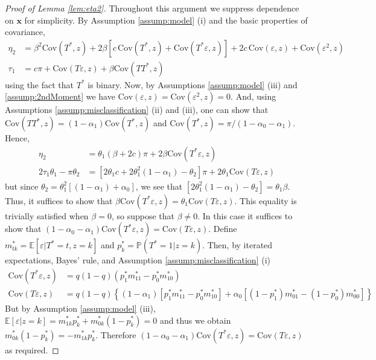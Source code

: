 \documentclass[12pt]{article}
\begin{document}
\begin{proof}[Proof of Lemma \ref{lem:eta2}]
  Throughout this argument we suppress dependence on $\mathbf{x}$ for simplicity. 
  By Assumption \ref{assump:model} (i) and the basic properties of covariance, 
\begin{align*}
    \eta_2 &= \beta^2 \mbox{Cov}(T^*,z) + 2 \beta\left[ c\, \mbox{Cov}(T^*,z) + \mbox{Cov}(T^*\varepsilon,z)  \right] + 2c \, \mbox{Cov}(\varepsilon,z) + \mbox{Cov}(\varepsilon^2,z)\\
  \tau_1 &= c \pi + \mbox{Cov}(T\varepsilon,z) + \beta \mbox{Cov}(TT^*,z)
\end{align*}
using the fact that $T^*$ is binary. 
Now, by Assumptions \ref{assump:model} (iii) and \ref{assump:2ndMoment} we have $\mbox{Cov}(\varepsilon,z) = \mbox{Cov}(\varepsilon^2,z) = 0$.
And, using Assumptions \ref{assump:misclassification} (ii) and (iii), one can show that $\mbox{Cov}(TT^*,z) = (1 - \alpha_1)\mbox{Cov}(T^*,z)$ and $\mbox{Cov}(T^*,z) = \pi/(1 - \alpha_0 - \alpha_1)$.
Hence, 
\begin{align*}
  \eta_2 &= \theta_1\left( \beta 
+ 2 c \right) \pi + 2\beta \mbox{Cov}(T^*\varepsilon,z) \\
  2 \tau_1 \theta_1 - \pi \theta_2 &= \left[2\theta_1 c + 2 \theta_1^2 (1 - \alpha_1) - \theta_2\right]\pi + 2\theta_1 \mbox{Cov}(T\varepsilon,z) 
\end{align*}
but since $\theta_2 = \theta_1^2 \left[ (1 - \alpha_1) + \alpha_0 \right]$, we see that $[2\theta_1^2(1 - \alpha_1) - \theta_2] = \theta_1 \beta$.
Thus, it suffices to show that $\beta \mbox{Cov}(T^*\varepsilon,z) = \theta_1 \mbox{Cov}(T\varepsilon,z)$.
This equality is trivially satisfied when $\beta=0$, so suppose that $\beta \neq 0$. 
In this case it suffices to show that $(1 - \alpha_0 - \alpha_1) \mbox{Cov}(T^*\varepsilon,z) = \mbox{Cov}(T\varepsilon,z)$.
Define $m^*_{tk} = \mathbb{E}\left[ \varepsilon|T^*=t,z=k \right]$ and $p^*_k = \mathbb{P}(T^*=1|z=k)$.
Then, by iterated expectations, Bayes' rule, and Assumption \ref{assump:misclassification} (i)
\begin{align*}
  \mbox{Cov}(T^*\varepsilon,z) &=q(1 - q)\left(p_1^* m_{11}^*  - p_0^*m_{10}^* \right) \\
  \mbox{Cov}(T\varepsilon,z) &= q(1 - q)\left\{ (1 - \alpha_1)\left[ p_1^* m_{11}^* - p_0^* m_{10}^* \right] + \alpha_0\left[ (1 - p_1^*) m_{01}^* - (1 - p_0^*)m_{00}^* \right] \right\} 
\end{align*}
But by Assumption \ref{assump:model} (iii), $\mathbb{E}[\varepsilon|z=k] = m_{1k}^*p_{k}^* + m_{0k}^*(1 - p_k^*)=0$ and thus we obtain $m_{0k}^*(1 - p_k^*)= - m_{1k}^* p_k^*$.
Therefore  $(1 - \alpha_0 - \alpha_1) \mbox{Cov}(T^*\varepsilon,z) = \mbox{Cov}(T\varepsilon,z)$ as required.
\end{proof}
 
\end{document}
